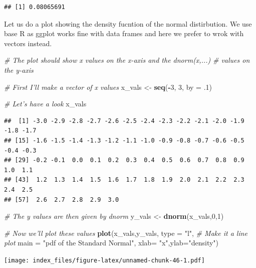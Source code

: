 \documentclass[]{article}
\newenvironment{Shaded}{\begin{snugshade}}{\end{snugshade}}
\newcommand{\CommentTok}[1]{\textcolor[rgb]{0.56,0.35,0.01}{\textit{#1}}}
\newcommand{\DataTypeTok}[1]{\textcolor[rgb]{0.13,0.29,0.53}{#1}}
\newcommand{\DecValTok}[1]{\textcolor[rgb]{0.00,0.00,0.81}{#1}}
\newcommand{\FloatTok}[1]{\textcolor[rgb]{0.00,0.00,0.81}{#1}}
\newcommand{\KeywordTok}[1]{\textcolor[rgb]{0.13,0.29,0.53}{\textbf{#1}}}
\newcommand{\NormalTok}[1]{#1}
\newcommand{\OperatorTok}[1]{\textcolor[rgb]{0.81,0.36,0.00}{\textbf{#1}}}
\newcommand{\StringTok}[1]{\textcolor[rgb]{0.31,0.60,0.02}{#1}}
\begin{document}
\begin{verbatim}
## [1] 0.08065691
\end{verbatim}

Let us do a plot showing the density fucntion of the normal
distirbution. We use base R as ggplot works fine with data frames and
here we prefer to wrok with vectors instead.

\begin{Shaded}
\begin{Highlighting}[]
\CommentTok{# The plot should show x values on the x-axis and the dnorm(x,...) }
\CommentTok{# values on the y-axis}

\CommentTok{# First I'll make a vector of x values}
\NormalTok{x_vals <-}\StringTok{ }\KeywordTok{seq}\NormalTok{(}\OperatorTok{-}\DecValTok{3}\NormalTok{, }\DecValTok{3}\NormalTok{, }\DataTypeTok{by =} \FloatTok{.1}\NormalTok{)}

\CommentTok{# Let's have a look}
\NormalTok{x_vals}
\end{Highlighting}
\end{Shaded}

\begin{verbatim}
##  [1] -3.0 -2.9 -2.8 -2.7 -2.6 -2.5 -2.4 -2.3 -2.2 -2.1 -2.0 -1.9 -1.8 -1.7
## [15] -1.6 -1.5 -1.4 -1.3 -1.2 -1.1 -1.0 -0.9 -0.8 -0.7 -0.6 -0.5 -0.4 -0.3
## [29] -0.2 -0.1  0.0  0.1  0.2  0.3  0.4  0.5  0.6  0.7  0.8  0.9  1.0  1.1
## [43]  1.2  1.3  1.4  1.5  1.6  1.7  1.8  1.9  2.0  2.1  2.2  2.3  2.4  2.5
## [57]  2.6  2.7  2.8  2.9  3.0
\end{verbatim}

\begin{Shaded}
\begin{Highlighting}[]
\CommentTok{# The y values are then given by dnorm}
\NormalTok{y_vals <-}\StringTok{ }\KeywordTok{dnorm}\NormalTok{(x_vals,}\DecValTok{0}\NormalTok{,}\DecValTok{1}\NormalTok{)}

\CommentTok{# Now we'll plot these values}
\KeywordTok{plot}\NormalTok{(x_vals,y_vals, }
     \DataTypeTok{type =} \StringTok{"l"}\NormalTok{, }\CommentTok{# Make it a line plot}
     \DataTypeTok{main =} \StringTok{"pdf of the Standard Normal"}\NormalTok{,}
     \DataTypeTok{xlab=} \StringTok{"x"}\NormalTok{,}\DataTypeTok{ylab=}\StringTok{"density"}\NormalTok{) }
\end{Highlighting}
\end{Shaded}

\texttt{[image: index\_files/figure-latex/unnamed-chunk-46-1.pdf]}
\end{document}
